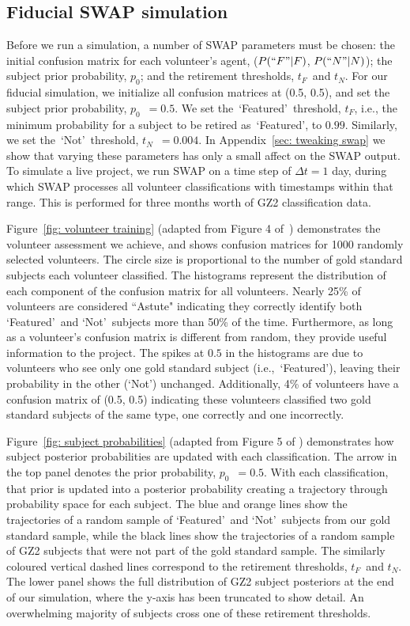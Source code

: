 \documentclass[twocolumn,  trackchanges,]{aastex6}%
\newcommand{\Pf}{$P(``F"|F)$}
\newcommand{\Pn}{$P(``N"|N)$}
\newcommand{\p}{$p_0$}
\newcommand{\tf}{$t_F$}
\newcommand{\tn}{$t_N$}
\newcommand{\feat}{`Featured'}
\newcommand{\notfeat}{`Not'}
\begin{document}
\subsection{Fiducial SWAP simulation}\label{sec: fiducial}

Before we run a simulation, a number of SWAP parameters must be chosen: 
 the initial confusion matrix for each volunteer's agent, (\Pf, \Pn);
the subject prior probability, \p; and the retirement thresholds, \tf~and \tn. 
For our fiducial  simulation, we initialize all confusion matrices at (0.5, 0.5), 
and set the subject prior probability, \p~$= 0.5$. 
We set the~\feat~threshold, \tf, i.e., the minimum probability for a subject to be retired as~\feat, to $0.99$. Similarly, we set the~\notfeat~threshold, \tn~$= 0.004$. 
In Appendix~\ref{sec: tweaking swap} 
we show that varying these parameters has only a small affect on the SWAP output. 
To simulate a live project, we run SWAP on a time step of $\Delta t = 1$ day, 
during which SWAP processes all volunteer classifications with timestamps 
within that range. This is performed for three months worth of GZ2 classification data. 


Figure~\ref{fig: volunteer training} (adapted from Figure 4 of~\citealt{Marshall2016})
demonstrates the volunteer assessment we achieve, and shows confusion matrices 
 for 1000 randomly selected volunteers. The circle size is proportional to the number of 
gold standard subjects each volunteer classified. 
The histograms represent the distribution of each component
of the confusion matrix for all volunteers.
 Nearly 25\% of volunteers are considered ``Astute"  indicating
they correctly identify both \feat~and \notfeat~subjects more than 50\% of the time. 
Furthermore, as long as a volunteer's confusion matrix is different from random, 
they provide useful information to the project.
The spikes at $0.5$ in the histograms are due to volunteers who see only one 
gold standard subject (i.e.,~\feat), leaving their probability in the 
other (\notfeat) unchanged.
Additionally, 4\% of volunteers have a confusion matrix of (0.5, 0.5) indicating these 
volunteers classified two gold standard subjects of the same type, one correctly and 
one incorrectly. 


Figure~\ref{fig: subject probabilities} (adapted from Figure 5 of \citealt{Marshall2016}) 
demonstrates how subject posterior probabilities are updated with each classification. 
The arrow in the top panel denotes the prior probability, \p~$=0.5$. 
With each classification, that prior is updated into a posterior probability creating a trajectory through probability space for each subject. 
The blue and orange lines show the trajectories of a random sample of \feat~and 
\notfeat~subjects from our gold standard sample, while the black lines show the 
trajectories of a random sample of GZ2 subjects that were not part of the 
gold standard  sample. The similarly coloured vertical dashed lines correspond to the
 retirement thresholds, \tf~and \tn. The lower panel shows the full distribution of 
GZ2 subject posteriors at the end of our simulation, where the y-axis has been truncated to show detail. An overwhelming majority of subjects cross one of these retirement thresholds.
\end{document}
